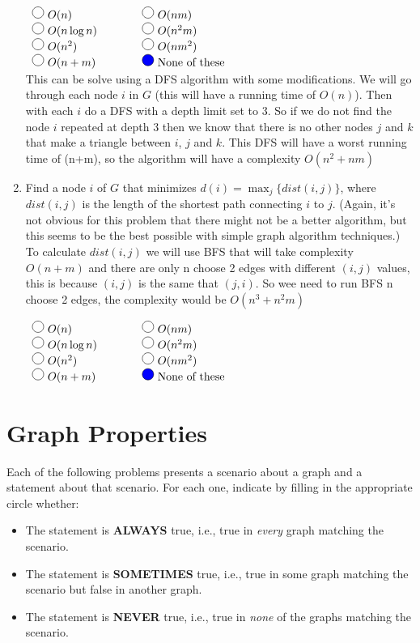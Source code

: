 \documentclass[11pt]{article}
\def\ans#1{{\color{ans}#1}}
\newcommand{\fillinMCmath}[1]{\begin{tikzpicture}\draw circle [radius=0.5em];\end{tikzpicture}\ #1}
\newcommand{\fillinMCsoln}[1]{\fillinMCmathsoln{\mbox{#1}}}
\newcommand{\fillinMCmathsoln}[1]{\begin{tikzpicture}\draw[black, fill=blue] circle [radius=0.5em];\end{tikzpicture}\ #1}
\begin{document}
\begin{enumerate}
$\begin{array}{lcl}
\fillinMCmath{O(n)} & \qquad & \fillinMCmath{O(nm)} \\
\fillinMCmath{O(n\log n)} & \qquad & \fillinMCmath{O(n^2m)}\\
\fillinMCmath{O(n^2)} & \qquad & \fillinMCmath{O(nm^2)}\\
\fillinMCmath{O(n+m)} & \qquad & \fillinMCsoln{None of these}
\end{array}$\\
\ans{
  This can be solve using a DFS algorithm with some modifications. We will go through each 
  node $i$ in $G$ (this will have a running time of $O(n)$). Then with each $i$ do a DFS 
  with a depth limit set to $3$. So if we do not find the node $i$ repeated at depth $3$ 
  then we know that there is no other nodes $j$ and $k$ that make a triangle 
  between $i$, $j$ and $k$. This DFS will have a worst running time of (n+m), so the 
  algorithm will have a complexity $O(n^2+nm)$ \\
}

\item Find a node $i$ of $G$ that minimizes $d(i) = \max_j \{
      \textit{dist}(i, j) \}$, where $\textit{dist}(i,j)$ is the
length of the shortest path connecting $i$ to $j$. (Again, it's
not obvious for this problem that there might not be a better
algorithm, but this seems to be the best possible with simple
graph algorithm techniques.)
\ans{
  To calculate $\textit{dist}(i,j)$ we will use BFS that will take complexity $O(n+m)$ 
  and there are only n choose 2 edges with different $(i,j)$ values, this is because 
  $(i,j)$ is the same that $(j,i)$. So wee need to run BFS n choose 2 edges, the complexity 
  would be $O(n^3+n^2m)$
}

$\begin{array}{lcl}
\fillinMCmath{O(n)} & \qquad & \fillinMCmath{O(nm)} \\
\fillinMCmath{O(n\log n)} & \qquad & \fillinMCmath{O(n^2m)}\\
\fillinMCmath{O(n^2)} & \qquad & \fillinMCmath{O(nm^2)}\\
\fillinMCmath{O(n+m)} & \qquad & \fillinMCsoln{None of these}
\end{array}$
\end{enumerate}

\section{Graph Properties}
\label{sec-2}
Each of the following problems presents a scenario about a graph and a
statement about that scenario. For each one, indicate by filling in
the appropriate circle whether:
\begin{itemize}
\item The statement is \textbf{ALWAYS} true, i.e., true in \emph{every} graph
matching the scenario.
\item The statement is \textbf{SOMETIMES} true, i.e., true in some graph
matching the scenario but false in another graph.
\item The statement is \textbf{NEVER} true, i.e., true in \emph{none} of the graphs
matching the scenario.
\end{itemize}
\end{document}
